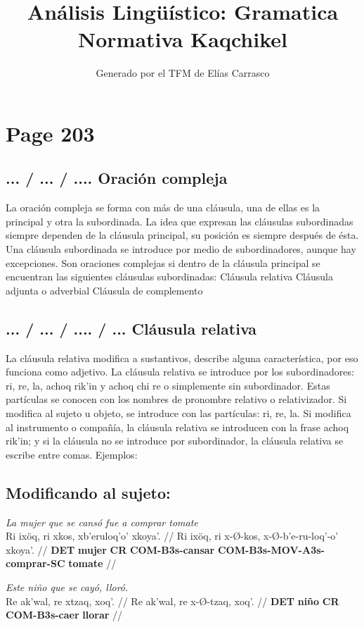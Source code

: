 \documentclass{article}%
\title{Análisis Lingüístico: Gramatica Normativa Kaqchikel}%
\author{Generado por el TFM de Elías Carrasco}%
\begin{document}
%
\normalsize%
\maketitle%
\section{Page 203}%
\label{sec:Page203}%
\subsection{... / ... / .... Oración compleja}%
\label{subsec:.../.../....Oracincompleja}%

%
La oración compleja se forma con más de una cláusula, una de ellas es la principal y %
otra la subordinada. La idea que expresan las cláusulas subordinadas siempre dependen %
de la cláusula principal, su posición es siempre después de ésta. Una cláusula subordinada %
se introduce por medio de subordinadores, aunque hay excepciones. Son oraciones %
complejas si dentro de la cláusula principal se encuentran las siguientes cláusulas %
subordinadas: %
Cláusula relativa %
Cláusula adjunta o adverbial %
Cláusula de complemento %
\subsection{... / ... / .... / ... Cláusula relativa}%
\label{subsec:.../.../..../...Clusularelativa}%

%
La cláusula relativa modifica a sustantivos, describe alguna característica, por eso %
funciona como adjetivo. La cláusula relativa se introduce por los subordinadores: ri, %
re, la, achoq rik'in y achoq chi re o simplemente sin subordinador. Estas partículas se %
conocen con los nombres de pronombre relativo o relativizador. Si modifica al sujeto u %
objeto, se introduce con las partículas: ri, re, la. Si modifica al instrumento o compañía, %
la cláusula relativa se introducen con la frase achoq rik'in; y si la cláusula no se %
introduce por subordinador, la cláusula relativa se escribe entre comas. Ejemplos: %
\subsection{Modificando al sujeto:}%
\label{subsec:Modificandoalsujeto}%

%
\par\medskip%
\ex
\textit{La mujer que se cansó fue a comprar tomate} \\
\begingl
\gla Ri ixöq, ri xkos, xb'eruloq'o' xkoya'. //
\glb Ri ixöq, ri x-Ø-kos, x-Ø-b'e-ru-loq'-o' xkoya'. //
\glc \textbf{DET} \textbf{mujer} \textbf{CR} \textbf{COM-}\textbf{B3s-}\textbf{cansar} \textbf{COM-}\textbf{B3s-}\textbf{MOV-}\textbf{A3s-}\textbf{comprar-}\textbf{SC} \textbf{tomate} //
\endgl
\xe
%
\medskip%
\par\medskip%
\ex
\textit{Este niño que se cayó, lloró.} \\
\begingl
\gla Re ak'wal, re xtzaq, xoq'. //
\glb Re ak'wal, re x-Ø-tzaq, xoq'. //
\glc \textbf{DET} \textbf{niño} \textbf{CR} \textbf{COM-}\textbf{B3s-}\textbf{caer} \textbf{llorar} //
\endgl
\xe
%
\medskip

%
\end{document}
